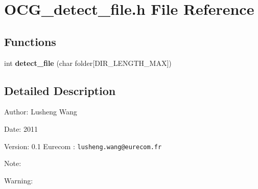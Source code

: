 \section{OCG\_\-detect\_\-file.h File Reference}
\label{OCG__detect__file_8h}
\subsection*{Functions}
\begin{CompactItemize}
\item 
int {\bf detect\_\-file} (char folder[DIR\_\-LENGTH\_\-MAX])
\end{CompactItemize}


\subsection{Detailed Description}
\begin{Desc}
\item[Author:]Lusheng Wang \end{Desc}
\begin{Desc}
\item[Date:]2011 \end{Desc}
\begin{Desc}
\item[Version:]0.1  Eurecom : {\tt lusheng.wang@eurecom.fr} \end{Desc}
\begin{Desc}
\item[Note:]\end{Desc}
\begin{Desc}
\item[Warning:]\end{Desc}
